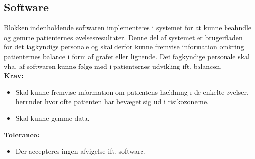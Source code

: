 \subsection{Software}
Blokken indenholdende softwaren implementeres i systemet for at kunne beahndle og gemme patienternes øvelsesresultater. Denne del af systemet er brugerfladen for det fagkyndige personale og skal derfor kunne fremvise information omkring patienternes balance i form af grafer eller lignende. Det fagkyndige personale skal vha. af softwaren kunne følge med i patienternes udvikling ift. balancen. \\
\textbf{Krav:}
\begin{itemize}
\item Skal kunne fremvise information om patientens hældning i de enkelte øvelser, herunder hvor ofte patienten har bevæget sig ud i risikozonerne. 
\item Skal kunne gemme data.
\end{itemize}
\textbf{Tolerance:}
\begin{itemize}
\item Der accepteres ingen afvigelse ift. software. 
\end{itemize}
